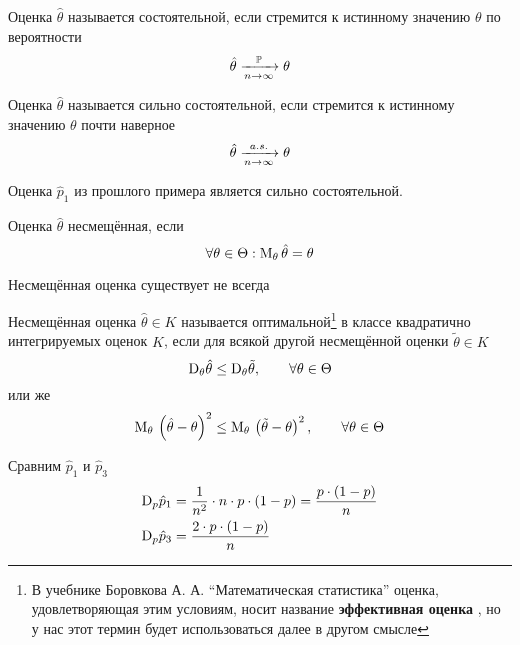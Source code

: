 \begin{definition}
    Оценка $\hat{\theta}$ называется состоятельной,
    если стремится к истинному значению $\theta$ по вероятности
    $$\hat{\theta}\xrightarrow[n\to\infty]{\mathbb{P}}\theta$$
\end{definition}
\begin{definition}
    Оценка $\hat{\theta}$ называется сильно состоятельной,
    если стремится к истинному значению $\theta$ почти наверное
    $$\hat{\theta}\xrightarrow[n\to\infty]{a.s.}\theta$$
\end{definition}
\begin{example}
    Оценка $\hat{p}_1$ из прошлого примера является сильно состоятельной.
\end{example}
\begin{definition}
    Оценка $\hat{\theta}$ несмещённая, если
    $$\forall\theta\in\Theta: \mathrm{M}_{\theta}\,\hat{\theta}=\theta$$
\end{definition}
\begin{remark}Несмещённая оценка существует не всегда
\end{remark}
\begin{definition}Несмещённая оценка $\hat{\theta}\in K$
называется оптимальной\footnote{В учебнике Боровкова А. А.
``Математическая статистика'' оценка, удовлетворяющая этим условиям,
носит название \textbf{эффективная оценка} \cite[стр.~130]{BorovkovMS},
но у нас этот термин будет использоваться далее в другом смысле}
в классе квадратично интегрируемых оценок $K$,
если для всякой другой несмещённой оценки $\tilde{\theta}\in K$
$$\mathrm{D}_{\theta} \hat{\theta}\le\mathrm{D}_{\theta} \tilde{\theta},
\qquad \forall\theta\in\Theta$$
или же
$$\mathrm{M}_{\theta}\,\left(\hat{\theta}-\theta\right)^2
\le\mathrm{M}_{\theta}\,\left(\tilde{\theta}-\theta\right)^2,
\qquad \forall\theta\in\Theta$$
\end{definition}

\begin{example}Сравним $\hat{p}_1$ и $\hat{p}_3$
    \begin{align*}
    \mathrm{D}_{p} \hat{p}_1
        &=\frac{1}{n^2}\cdot n\cdot p\cdot\left(1-p\right)
        =\frac{p\cdot\left(1-p\right)}{n}\\
    \mathrm{D}_{p} \hat{p}_3
        &=\frac{2\cdot p\cdot\left(1-p\right)}{n}
    \end{align*}
\end{example}
